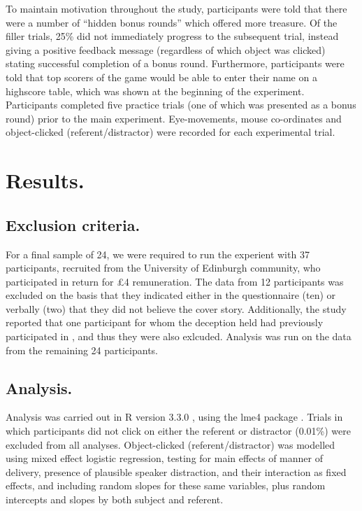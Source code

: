 \documentclass[man]{apa6}
\begin{document}
To maintain motivation throughout the study, participants were told that there were a number of ``hidden bonus rounds'' which offered more treasure. 
Of the filler trials, 25\% did not immediately progress to the subsequent trial, instead giving a positive feedback message (regardless of which object was clicked) stating successful completion of a bonus round. 
Furthermore, participants were told that top scorers of the game would be able to enter their name on a highscore table, which was shown at the beginning of the experiment. 
Participants completed five practice trials (one of which was presented as a bonus round) prior to the main experiment. 
Eye-movements, mouse co-ordinates and object-clicked (referent/distractor) were recorded for each experimental trial.\\

\section{Results.}
\subsection{Exclusion criteria.}
For a final sample of 24, we were required to run the experient with 37 participants, recruited from the University of Edinburgh community, who participated in return for £4 remuneration. 
The data from 12 participants was excluded on the basis that they indicated either in the questionnaire (ten) or verbally (two) that they did not believe the cover story. 
Additionally, the study reported that one participant for whom the deception held had previously participated in \citet{Loy2016}, and thus they were also exlcuded. 
Analysis was run on the data from the remaining 24 participants.\\

\subsection{Analysis.}
Analysis was carried out in R version 3.3.0 \citep{rbase}, using the lme4 package \citep{lme4}. 
Trials in which participants did not click on either the referent or distractor (0.01\%) were excluded from all analyses. 
Object-clicked (referent/distractor) was modelled using mixed effect logistic regression, testing for main effects of manner of delivery, presence of plausible speaker distraction, and their interaction as fixed effects, and including random slopes for these same variables, plus random intercepts and slopes by both subject and referent. \\
\end{document}
